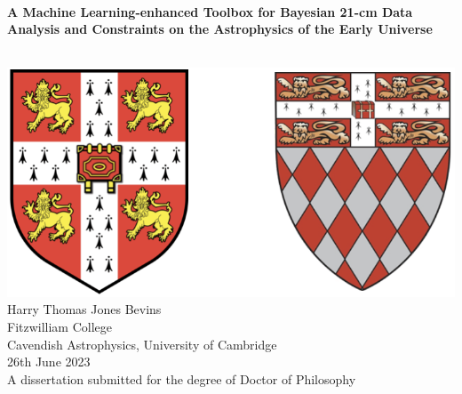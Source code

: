 \ifpdf
\fi
%
%
\begin{center}
 \qquad\\[10mm]
 {\renewcommand\baselinestretch{1.2}\Huge\textbf{
   A Machine Learning-enhanced Toolbox for Bayesian 21-cm Data Analysis and Constraints on the Astrophysics of the Early Universe
 }\par}
 \qquad\\[10mm]
 \includegraphics[width=0.6\linewidth]{arms.png} \\ [10mm]
 {\LARGE Harry Thomas Jones Bevins}\\[10mm]
 {\large Fitzwilliam College}\\[10mm]
 {\large Cavendish Astrophysics, University of Cambridge}\\[10mm]
 {\Large 26th June 2023}\\[10mm]
 {\large A dissertation submitted for the degree of Doctor of Philosophy}
\end{center}

\cleardoublepage

\endinput